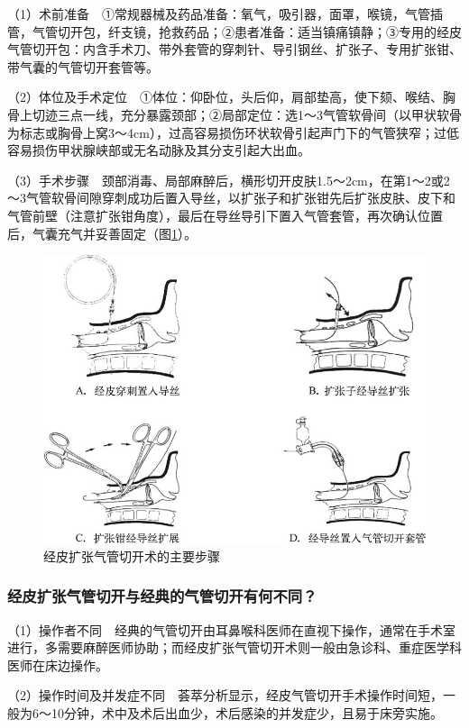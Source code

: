 （1）术前准备　①常规器械及药品准备：氧气，吸引器，面罩，喉镜，气管插管，气管切开包，纤支镜，抢救药品；②患者准备：适当镇痛镇静；③专用的经皮气管切开包：内含手术刀、带外套管的穿刺针、导引钢丝、扩张子、专用扩张钳、带气囊的气管切开套管等。

（2）体位及手术定位　①体位：仰卧位，头后仰，肩部垫高，使下颏、喉结、胸骨上切迹三点一线，充分暴露颈部；②局部定位：选1～3气管软骨间（以甲状软骨为标志或胸骨上窝3～4cm），过高容易损伤环状软骨引起声门下的气管狭窄；过低容易损伤甲状腺峡部或无名动脉及其分支引起大出血。

（3）手术步骤　颈部消毒、局部麻醉后，横形切开皮肤1.5～2cm，在第1～2或2～3气管软骨间隙穿刺成功后置入导丝，以扩张子和扩张钳先后扩张皮肤、皮下和气管前壁（注意扩张钳角度），最后在导丝导引下置入气管套管，再次确认位置后，气囊充气并妥善固定（图\ref{fig9-6}）。

\begin{figure}[!htbp]
 \centering
 \includegraphics{./images/Image00077.jpg}
 \captionsetup{justification=centering}
 \caption{经皮扩张气管切开术的主要步骤}
 \label{fig9-6}
  \end{figure} 

\subsubsection{经皮扩张气管切开与经典的气管切开有何不同？}

（1）操作者不同　经典的气管切开由耳鼻喉科医师在直视下操作，通常在手术室进行，多需要麻醉医师协助；而经皮扩张气管切开术则一般由急诊科、重症医学科医师在床边操作。

（2）操作时间及并发症不同　荟萃分析显示，经皮气管切开手术操作时间短，一般为6～10分钟，术中及术后出血少，术后感染的并发症少，且易于床旁实施。

